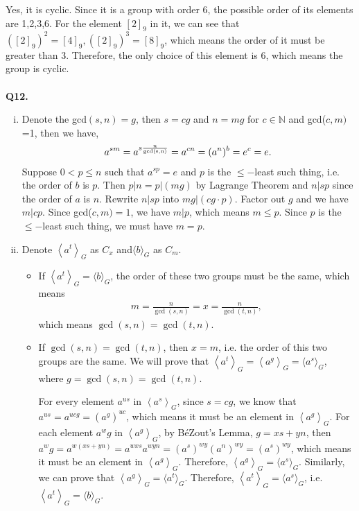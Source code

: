 \documentclass{article}[12pt]
\begin{document}
Yes, it is cyclic. Since it is a group with order 6, the possible order of its elements are 1,2,3,6. For the element $[2]_9$ in it, we can see that $([2]_9)^2=[4]_9,([2]_9)^3=[8]_9$, which means the order of it must be greater than 3. Therefore, the only choice of this element is 6, which means the group is cyclic.\\ \\
\noindent \textbf{Q12.}
\begin{enumerate}[(i)]
\item Denote the gcd$(s,n)=g$, then $s=cg$ and $n=mg$ for $c\in \mathbb{N}$ and gcd($c,m)$=1, then we have, 
\begin{align*}
a^{sm}=a^{s\frac{n}{\rm{gcd}(s,n)}}=a^{cn}=(a^n)^b=e^c=e.
\end{align*}
Suppose $0<p\leq n$ such that $a^{sp}=e$ and $p$ is the $\leq-$least such thing, i.e. the order of $b$ is $p$. Then $p|n=p|(mg)$ by Lagrange Theorem and $n|sp$ since the order of $a$ is $n$. Rewrite $n|sp$ into $mg|(cg\cdot p)$. Factor out  $g$ and we have $m|cp$. Since gcd($c,m)=1$, we have $m|p$, which means $m\leq p$. Since $p$ is the $\leq-$least such thing, we must have $m=p$.
\item Denote $\left\langle a^{t}\right\rangle_{G}$ as $C_x$ and$ \langle b\rangle_{G}$ as $C_m$. 
\begin{itemize}
\item If $\left\langle a^{t}\right\rangle_{G}=\langle b\rangle_{G}$, the order of these two groups must be the same, which means 
\begin{align*}
m=\frac{n}{\operatorname{gcd}(s, n)}=x=\frac{n}{\operatorname{gcd}(t, n)},
\end{align*}
which means $\operatorname{gcd}(s, n)=\operatorname{gcd}(t, n)$.
\item If $\operatorname{gcd}(s, n)=\operatorname{gcd}(t, n)$, then $x=m$, i.e. the order of this two groups are the same. 
We will prove that $\left\langle a^{t}\right\rangle_{G}=\left\langle a^{g}\right\rangle_{G}=\langle a^{s}\rangle_{G}$, where $g=\operatorname{gcd}(s, n)=\operatorname{gcd}(t, n)$. 
\par For every element $a^{us}$ in $\left\langle a^{s}\right\rangle_{G}$, since $s=cg$, we know that $a^{us}=a^{ucg}=(a^g)^{uc}$, which means it must be an element in $\left\langle a^{g}\right\rangle_{G}$. For each element $a^wg$ in $\left\langle a^{g}\right\rangle_{G}$, by B{\'e}Zout's Lemma, $g=xs+yn$, then $a^wg=a^{w(xs+yn)}=a^{wxs}a^{wyn}=(a^s)^{wy}(a^n)^{wy}=(a^s)^{wy}$, which means it must be an element in $\left\langle a^{g}\right\rangle_{G}$. Therefore, $\left\langle a^{g}\right\rangle_{G}=\langle a^{s}\rangle_{G}$. Similarly, we can prove that $\left\langle a^{g}\right\rangle_{G}=\langle a^{t}\rangle_{G}$. Therefore, $\left\langle a^{t}\right\rangle_{G}=\langle a^{s}\rangle_{G}$, i.e. $\left\langle a^{t}\right\rangle_{G}=\langle b\rangle_{G}$.  
\end{itemize}


\end{enumerate}






\end{document}
